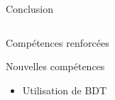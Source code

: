 \documentclass[9pt]{beamer}
\newcommand{\backupbegin}{
   \newcounter{framenumberappendix}
   \setcounter{framenumberappendix}{\value{framenumber}}
}
\newcommand{\backupend}{
   \addtocounter{framenumberappendix}{-\value{framenumber}}
   \addtocounter{framenumber}{\value{framenumberappendix}} 
}
\begin{document}
\begin{frame}{Conclusion}
\begin{columns}
\begin{column}{0.45\textwidth}
\begin{block}{Compétences renforcées}
\begin{itemize}
			\end{itemize}
		\end{block}
        
        \begin{exampleblock}{Nouvelles compétences}
			\begin{itemize}
		 		\item Utilisation de BDT
			\end{itemize}
		\end{exampleblock}
        
	\end{column}

\end{columns}

\end{frame}















\end{document}
